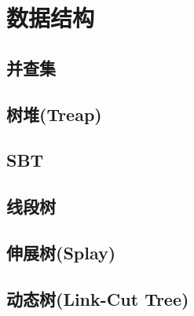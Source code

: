 \section{数据结构}
\subsection{并查集}
\subsection{树堆(Treap)}
\subsection{SBT}
\subsection{线段树}
\subsection{伸展树(Splay)}
\subsection{动态树(Link-Cut Tree)}
